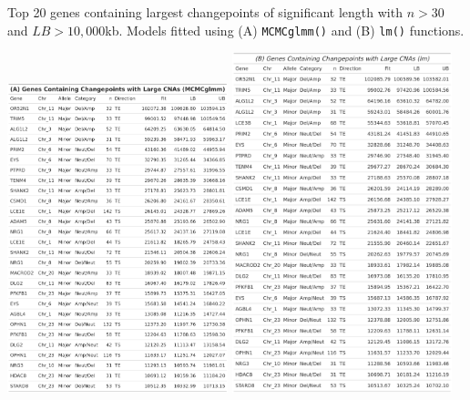 \vfill
\begin{table}[!h]
\vspace{5cm}
\caption[Top 20 genes containing largest changepoints of significant length with $n > 30$ and $LB > 10,000$kb.]{Top 20 genes containing largest changepoints of significant length with $n > 30$ and $LB > 10,000$kb. Models fitted using (A) \texttt{MCMCglmm()} and (B) \texttt{lm()} functions.}
\centering
\includegraphics[width = 0.48\textwidth]{../tables/Chapter_6/Gene_MCMC_1_Thesis.png}
\includegraphics[width = 0.48\textwidth]{../tables/Chapter_6/Gene_LM_1_Thesis.png}
\label{tab:TopLength_Genes_1}
\end{table}
\vfill

